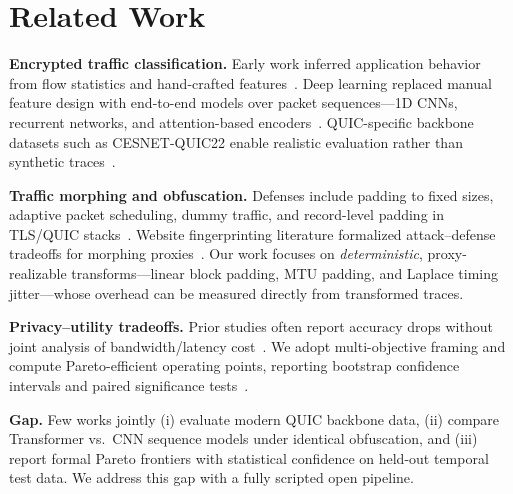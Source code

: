 \section{Related Work}
\label{sec:related}

\textbf{Encrypted traffic classification.}
Early work inferred application behavior from flow statistics and hand-crafted
features~\cite{wright2009,anderson2016}. Deep learning replaced manual feature design
with end-to-end models over packet sequences---1D CNNs, recurrent networks, and
attention-based encoders~\cite{wang2017,rezaei2019,traffic_survey,transformer_traffic,vaswani2017}.
QUIC-specific backbone datasets such as CESNET-QUIC22 enable realistic evaluation
rather than synthetic traces~\cite{cesnet_quic22,ring2019}.

\textbf{Traffic morphing and obfuscation.}
Defenses include padding to fixed sizes, adaptive packet scheduling, dummy traffic,
and record-level padding in TLS/QUIC stacks~\cite{rfc9001,dyer2012}. Website
fingerprinting literature formalized attack--defense tradeoffs for morphing
proxies~\cite{walkie_talkie,hayes2016}. Our work focuses on \emph{deterministic},
proxy-realizable transforms---linear block padding, MTU padding, and Laplace timing
jitter---whose overhead can be measured directly from transformed traces.

\textbf{Privacy--utility tradeoffs.}
Prior studies often report accuracy drops without joint analysis of bandwidth/latency
cost~\cite{shusterman2021}. We adopt multi-objective framing and compute
Pareto-efficient operating points, reporting bootstrap confidence intervals and paired
significance tests~\cite{efron1993,mcnemar1947}.

\textbf{Gap.}
Few works jointly (i) evaluate modern QUIC backbone data, (ii) compare Transformer
vs.\ CNN sequence models under identical obfuscation, and (iii) report formal Pareto
frontiers with statistical confidence on held-out temporal test data. We address this
gap with a fully scripted open pipeline.

